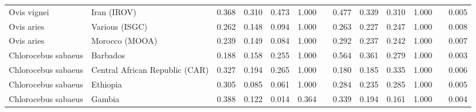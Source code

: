 \begin{center}
\begin{adjustbox}{width = 1\textwidth}
\begin{tabular}{|l|l|r|r|r|r|r|r|r|r|r|}
         Ovis vignei &                     Iran (IROV) &                 0.368 &                                0.310 &                0.473 &                                  1.000~~ &                 0.477 &                                0.339 &                0.310 &                                  1.000~~ &              0.005 \\
          Ovis aries &                  Various (ISGC) &                 0.262 &                                0.148 &                0.094 &                                  1.000~~ &                 0.263 &                                0.227 &                0.247 &                                  1.000~~ &              0.008 \\
          Ovis aries &                  Morocco (MOOA) &                 0.239 &                                0.149 &                0.084 &                                  1.000~~ &                 0.292 &                                0.237 &                0.242 &                                  1.000~~ &              0.007 \\
 Chlorocebus sabaeus &                        Barbados &                 0.188 &                                0.158 &                0.255 &                                  1.000~~ &                 0.564 &                                0.361 &                0.279 &                                  1.000~~ &              0.003 \\
 Chlorocebus sabaeus &  Central African Republic (CAR) &                 0.327 &                                0.194 &                0.265 &                                  1.000~~ &                 0.180 &                                0.185 &                0.335 &                                  1.000~~ &              0.006 \\
 Chlorocebus sabaeus &                        Ethiopia &                 0.305 &                                0.085 &                0.061 &                                  1.000~~ &                 0.284 &                                0.235 &                0.285 &                                  1.000~~ &              0.005 \\
 Chlorocebus sabaeus &                          Gambia &                 0.388 &                                0.122 &                0.014 &                                  0.364~~ &                 0.339 &                                0.194 &                0.161 &                                  1.000~~ &              0.004 \\

\end{tabular}
\end{adjustbox}
\end{center}
